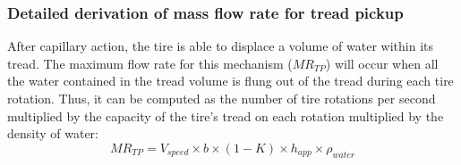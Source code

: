 \documentclass[12pt]{article}
\begin{document}
\subsubsection*{Detailed derivation of mass flow rate for tread pickup}


After capillary action, the tire is able to displace a volume of water within its tread. The maximum flow rate for this mechanism ($\mathit{MR_{TP}}$) will occur when all the water contained in the tread volume is flung out of the tread during each tire rotation. Thus, it can be computed as the number of tire rotations per second multiplied by the capacity of the tire’s tread on each rotation multiplied by the density of water:
 \[ 
\mathit{MR_{TP}} = V_{speed} \times b \times (1-K) \times h_{app} \times \rho_{water} 
\]
\\
\end{document}

